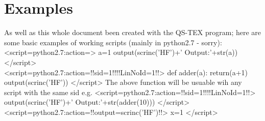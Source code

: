 \documentclass[a4paper,12pt,twocolum]{article}
\begin{document}
\section{Examples}
As well as this whole document been created with the QS-TEX program; here are some basic examples of working scripts (mainly in python2.7 - sorry):
<script=python2.7:action={}>
a=1
output(scrinc('HF')+' Output:'+str(a))
</script>
\\
<script=python2.7:action={!!sid=1!!!!LinNoId=1!!}>
def adder(a):
  return(a+1)
output(scrinc('HF'))
</script>
The above function will be usuable wih any script with the same sid e.g.
<script=python2.7:action={!!sid=1!!!!LinNoId=1!!}>
output(scrinc('HF')+' Output:'+str(adder(10)))
</script>
\\
<script=python2.7:action={!!output=scrinc('HF')!!}>
x=1
</script>
\end{document}
